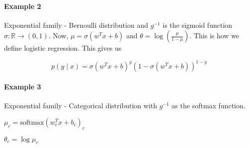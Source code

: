 \documentclass{article}
\begin{document}
\paragraph{Example 2} Exponential family - Bernoulli distribution and $g^{-1}$ is the sigmoid function $\sigma: \mathbb{R} \rightarrow (0, 1)$.
Now, $\mu = \sigma(w^Tx + b)$ and $\theta = \log \left(\frac{\mu }{1 - \mu}\right)$. This is how we define logistic regression. This gives us

$$p(y \mid x) = \sigma(w^Tx + b)^y(1 - \sigma(w^Tx + b))^{1-y}$$

\paragraph{Example 3} Exponential family - Categorical distribution with $g^{-1}$ as the softmax function.

$\mu_c = \text{softmax}(w_c^T x + b_c)_c$

$\theta_c = \log \mu_c$
\end{document}

